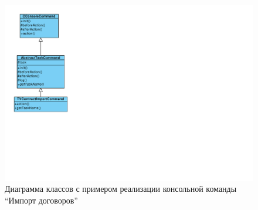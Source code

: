 \begin{figure}[!ht]
\begin{center}
\vspace{-0.5cm}
\includegraphics[scale=0.7, trim=10mm 81mm 200mm 10mm, clip]{../resources/uml/AbstractTask.pdf}
\caption{Диаграмма классов с примером реализации консольной команды ``Импорт договоров''}
\label{gr:tasks_class}
\end{center}
\end{figure} 


